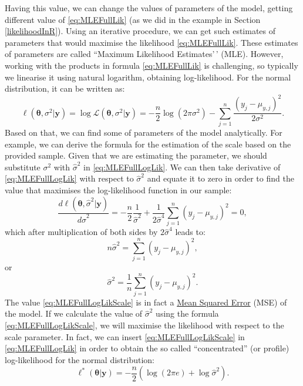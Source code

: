 \documentclass[
]{book}
\theoremstyle{definition}
\theoremstyle{definition}
\theoremstyle{definition}
\theoremstyle{definition}
\theoremstyle{remark}
\begin{document}
Having this value, we can change the values of parameters of the model, getting different value of \eqref{eq:MLEFullLik} (as we did in the example in Section \ref{likelihoodInR}). Using an iterative procedure, we can get such estimates of parameters that would maximise the likelihood \eqref{eq:MLEFullLik}. These estimates of parameters are called ``Maximum Likelihood Estimates'\,' (MLE). However, working with the products in formula \eqref{eq:MLEFullLik} is challenging, so typically we linearise it using natural logarithm, obtaining log-likelihood. For the normal distribution, it can be written as:
\begin{equation}
    \ell (\boldsymbol{\theta}, {\sigma}^2 | \mathbf{y}) = \log \mathcal{L} (\boldsymbol{\theta}, {\sigma}^2 | \mathbf{y}) = -\frac{n}{2} \log(2 \pi \sigma^2) -\sum_{j=1}^n \frac{\left(y_j - \mu_{y,j} \right)^2}{2 \sigma^2} .
    \label{eq:MLEFullLogLik}
\end{equation}
Based on that, we can find some of parameters of the model analytically. For example, we can derive the formula for the estimation of the scale based on the provided sample. Given that we are estimating the parameter, we should substitute \(\sigma^2\) with \(\hat{\sigma}^2\) in \eqref{eq:MLEFullLogLik}. We can then take derivative of \eqref{eq:MLEFullLogLik} with respect to \(\hat{\sigma}^2\) and equate it to zero in order to find the value that maximises the log-likelihood function in our sample:
\begin{equation}
    \frac{d \ell (\boldsymbol{\theta}, \hat{\sigma}^2 | \mathbf{y})}{d \hat{\sigma}^2} = -\frac{n}{2} \frac{1}{\hat{\sigma}^2} + \frac{1}{2 \hat{\sigma}^4}\sum_{j=1}^n \left(y_j - \mu_{y,j} \right)^2 =0 , 
    \label{eq:MLEFullLogLikScale01}
\end{equation}
which after multiplication of both sides by \(2 \hat{\sigma}^4\) leads to:
\begin{equation}
    n \hat{\sigma}^2 = \sum_{j=1}^n \left(y_j - \mu_{y,j} \right)^2 , 
    \label{eq:MLEFullLogLikScale02}
\end{equation}
or
\begin{equation}
    \hat{\sigma}^2 = \frac{1}{n}\sum_{j=1}^n \left(y_j - \mu_{y,j} \right)^2 .
    \label{eq:MLEFullLogLikScale}
\end{equation}
The value \eqref{eq:MLEFullLogLikScale} is in fact a \hyperref[errorMeasures]{Mean Squared Error} (MSE) of the model. If we calculate the value of \(\hat{\sigma}^2\) using the formula \eqref{eq:MLEFullLogLikScale}, we will maximise the likelihood with respect to the scale parameter. In fact, we can insert \eqref{eq:MLEFullLogLikScale} in \eqref{eq:MLEFullLogLik} in order to obtain the so called ``concentrated'' (or profile) log-likelihood for the normal distribution:
\begin{equation}
    \ell^* (\boldsymbol{\theta} | \mathbf{y}) = -\frac{n}{2}\left( \log(2 \pi e) + \log \hat{\sigma}^2 \right) .
    \label{eq:MLEFullLogLikConcentrated}
\end{equation}
\end{document}
